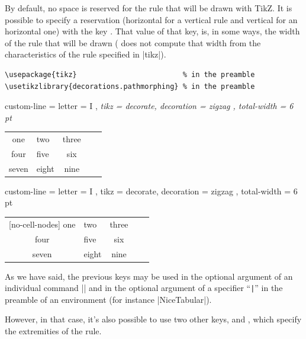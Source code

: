 \documentclass[dvipsnames]{article}
\begin{document}
\begin{itemize}[beginpenalty=10000]
By default, no space is reserved for the rule that will be drawn with TikZ. It
is possible to specify a reservation (horizontal for a vertical rule and
vertical for an horizontal one) with the key . That
value of that key, is, in some ways, the width of the rule that will be drawn
( does not compute that width from the characteristics of the
rule specified in |tikz|).

\bigskip
\begin{Verbatim}[formatcom = \footnotesize \color{gray}]
\usepackage{tikz}                         % in the preamble
\usetikzlibrary{decorations.pathmorphing} % in the preamble
\end{Verbatim}


\begin{Code}[width=9.1cm]
\NiceMatrixOptions
  {
    custom-line = 
     {
       letter = I , 
       \emph{tikz = { decorate, decoration = zigzag } ,
       total-width = 6 pt}
     }
  }

\begin{NiceTabular}{cIcIc}
  one & two & three \\
  four & five & six \\
  seven & eight & nine
\end{NiceTabular}
\end{Code}
\begin{scope}
\NiceMatrixOptions
  {
    custom-line = 
     {
       letter = I ,
       tikz = { decorate, decoration = zigzag } ,
       total-width = 6 pt
     }
  }
\begin{NiceTabular}{cIcIc}[no-cell-nodes]
  one & two & three \\
  four & five & six \\
  seven & eight & nine
\end{NiceTabular}
\end{scope}
\end{itemize}

\vspace{1cm}

As we have said, the previous keys may be used in the optional argument
of an individual command |\Hline| and in the optional argument of a specifier
``\verb+|+'' in the preamble of an environment (for instance |{NiceTabular}|).

However, in that case, it's also possible to use two other keys, 
and , which specify the extremities of the rule.
\end{document}
